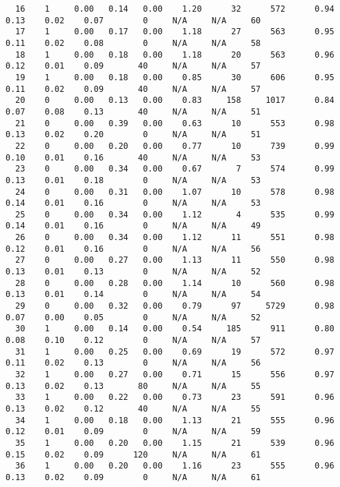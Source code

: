 \begin{lstlisting}
  16    1     0.00   0.14   0.00    1.20      32      572      0.94    0.13    0.02    0.07        0     N/A     N/A     60
  17    1     0.00   0.17   0.00    1.18      27      563      0.95    0.11    0.02    0.08        0     N/A     N/A     58
  18    1     0.00   0.18   0.00    1.18      20      563      0.96    0.12    0.01    0.09       40     N/A     N/A     57
  19    1     0.00   0.18   0.00    0.85      30      606      0.95    0.11    0.02    0.09       40     N/A     N/A     57
  20    0     0.00   0.13   0.00    0.83     158     1017      0.84    0.07    0.08    0.13       40     N/A     N/A     51
  21    0     0.00   0.39   0.00    0.63      10      553      0.98    0.13    0.02    0.20        0     N/A     N/A     51
  22    0     0.00   0.20   0.00    0.77      10      739      0.99    0.10    0.01    0.16       40     N/A     N/A     53
  23    0     0.00   0.34   0.00    0.67       7      574      0.99    0.13    0.01    0.18        0     N/A     N/A     53
  24    0     0.00   0.31   0.00    1.07      10      578      0.98    0.14    0.01    0.16        0     N/A     N/A     53
  25    0     0.00   0.34   0.00    1.12       4      535      0.99    0.14    0.01    0.16        0     N/A     N/A     49
  26    0     0.00   0.34   0.00    1.12      11      551      0.98    0.12    0.01    0.16        0     N/A     N/A     56
  27    0     0.00   0.27   0.00    1.13      11      550      0.98    0.13    0.01    0.13        0     N/A     N/A     52
  28    0     0.00   0.28   0.00    1.14      10      560      0.98    0.13    0.01    0.14        0     N/A     N/A     54
  29    0     0.00   0.32   0.00    0.79      97     5729      0.98    0.07    0.00    0.05        0     N/A     N/A     52
  30    1     0.00   0.14   0.00    0.54     185      911      0.80    0.08    0.10    0.12        0     N/A     N/A     57
  31    1     0.00   0.25   0.00    0.69      19      572      0.97    0.11    0.02    0.13        0     N/A     N/A     56
  32    1     0.00   0.27   0.00    0.71      15      556      0.97    0.13    0.02    0.13       80     N/A     N/A     55
  33    1     0.00   0.22   0.00    0.73      23      591      0.96    0.13    0.02    0.12       40     N/A     N/A     55
  34    1     0.00   0.18   0.00    1.13      21      555      0.96    0.12    0.01    0.09        0     N/A     N/A     59
  35    1     0.00   0.20   0.00    1.15      21      539      0.96    0.15    0.02    0.09      120     N/A     N/A     61
  36    1     0.00   0.20   0.00    1.16      23      555      0.96    0.13    0.02    0.09        0     N/A     N/A     61

\end{lstlisting}
